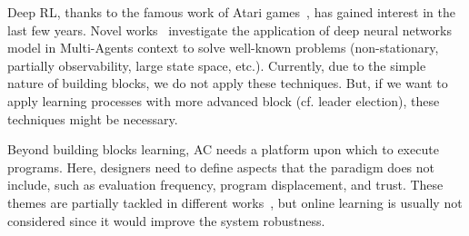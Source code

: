 \documentclass[conference]{IEEEtran}
\begin{document}
Deep RL, thanks to the famous work of Atari games~\cite{DBLP:journals/corr/HosuR16}, has gained interest in the last few years. 
%
Novel works~\cite{DBLP:journals/aamas/Hernandez-LealK19} investigate the application of deep neural networks model in Multi-Agents context to solve well-known problems (non-stationary, partially observability, large state space, etc.). 
%
Currently, due to the simple nature of building blocks, we do not apply these techniques. But, if we want to apply learning processes with more advanced block (cf. leader election), these techniques might be necessary.
%
%

Beyond building blocks learning, AC needs a platform upon which to execute programs. 
%
Here, designers need to define aspects that the paradigm does not include, such as evaluation frequency, program displacement, and trust.
% 
These themes are partially tackled in different works~\cite{DBLP:journals/scp/CasadeiAV18, DBLP:journals/fi/CasadeiPPVW20, DBLP:journals/corr/abs-2012-13806}, but online learning is usually not considered
since it would 
improve the system robustness.
%
\end{document}

